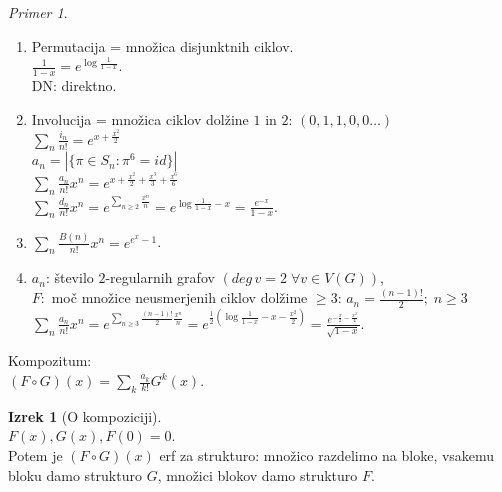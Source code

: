 \documentclass[a4paper, 12pt]{book}
\theoremstyle{definition}
\newtheorem{theorem}[counter]{Izrek}
\theoremstyle{remark}
\newtheorem*{ex}{Primer}
\begin{document}
\begin{ex} \text{} \\
  \begin{enumerate}[label=(\arabic*)]
    \item Permutacija = množica disjunktnih ciklov. \\
      $\frac{1}{1-x} = e^{\log \frac{1}{1-x}}$. \\
      DN: direktno.
    \item Involucija = množica ciklov dolžine $1$ in $2$: $(0,1,1,0,0 \dots)$ \\
      $\sum_{n} \frac{i_n}{n!} = e^{x+\frac{x^2}{2}}$ \\
      $a_n = |\{\pi \in S_n: \pi^6 = id\}|$ \\
      $\sum_n \frac{a_n}{n!} x^n = e^{x + \frac{x^2}{2} + \frac{x^3}{3} + \frac{x^6}{6}}$ \\
      $\sum_n \frac{d_n}{n!} x^n = e^{\sum_{n \geq 2} \frac{x^n}{n}} = e^{\log \frac{1}{1-x} - x} = \frac{e^{-x}}{1-x}$.
    \item $\sum_n \frac{B(n)}{n!} x^n = e^{e^x-1}$.
    \item $a_n$: število $2$-regularnih grafov $(deg \, v = 2\; \forall v \in V(G))$, \\
      $F:$ moč množice neusmerjenih ciklov dolžime $\geq 3$: $a_n = \frac{(n-1)!}{2}; \; n \geq 3$ \\
      $\sum_n \frac{a_n}{n!} x^n = e^{\sum_{n \geq 3} \frac{(n-1)!}{2} \frac{x^n}{n}} =
        e^{\frac{1}{2} \left(\log \frac{1}{1-x} - x - \frac{x^2}{2}\right)} =
        \frac{e^{-\frac{x}{2} - \frac{x^2}{4}}}{\sqrt{1-x}}$.
  \end{enumerate}
\end{ex}
Kompozitum: \\
$(F \circ G)(x) = \sum_k \frac{a_k}{k!} G^k(x)$.
\begin{theorem}[O kompoziciji] \text{} \\
  $F(x), G(x), F(0) = 0$. \\
  Potem je $(F \circ G)(x)$ erf za strukturo: množico razdelimo na bloke, vsakemu bloku damo strukturo $G$,
  množici blokov damo strukturo $F$.
\end{theorem}
\end{document}
